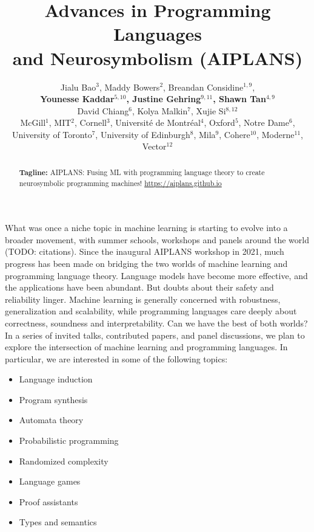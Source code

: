 \documentclass{article}
\title{Advances in Programming Languages\\ and Neurosymbolism (AIPLANS)}
\author{%
  Jialu Bao$^3$, Maddy Bowers$^2$, Breandan Considine$^{1, 9}$, \\\textbf{Younesse Kaddar$^{5, 10}$, Justine Gehring$^{9, 11}$, Shawn Tan$^{4, 9}$} \\
    David Chiang$^6$, Kolya Malkin$^7$, Xujie Si$^{8, 12}$\\
    McGill$^1$, MIT$^2$, Cornell$^3$, Universit\'e de Montr\'eal$^4$, Oxford$^{5}$, Notre Dame$^6$,\\University of Toronto$^7$, University of Edinburgh$^8$, Mila$^9$, Cohere$^{10}$, Moderne$^{11}$, Vector$^{12}$
}
\begin{document}
    \maketitle
    \vspace{-0.5cm}
    \begin{abstract}
        \textbf{Tagline:} AIPLANS: Fusing ML with programming language theory to create neurosymbolic programming machines! \url{https://aiplans.github.io} %
    \end{abstract}

    What was once a niche topic in machine learning is starting to evolve into a broader movement, with summer schools, workshops and panels around the world (TODO: citations). Since the inaugural AIPLANS workshop in 2021, much progress has been made on bridging the two worlds of machine learning and programming language theory. Language models have become more effective, and the applications have been abundant. But doubts about their safety and reliability linger. Machine learning is generally concerned with robustness, generalization and scalability, while programming languages care deeply about correctness, soundness and interpretability. Can we have the best of both worlds? In a series of invited talks, contributed papers, and panel discussions, we plan to explore the intersection of machine learning and programming languages. In particular, we are interested in some of the following topics:

    \begin{itemize}
        \item Language induction
        \item Program synthesis
        \item Automata theory
        \item Probabilistic programming
        \item Randomized complexity
        \item Language games
        \item Proof assistants
        \item Types and semantics
    \end{itemize}
\end{document}

